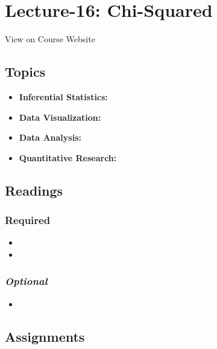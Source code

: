 \documentclass[]{book}
\providecommand{\tightlist}{%
  \setlength{\itemsep}{0pt}\setlength{\parskip}{0pt}}
\theoremstyle{definition}
\theoremstyle{definition}
\theoremstyle{definition}
\theoremstyle{remark}
\begin{document}
\section{Lecture-16: Chi-Squared}\label{lecture-16-chi-squared}

View on Course Website

\subsection*{Topics}\label{topics-16}

\begin{itemize}
\tightlist
\item
  \textbf{Inferential Statistics:}
\item
  \textbf{Data Visualization:}
\item
  \textbf{Data Analysis:}
\item
  \textbf{Quantitative Research:}
\end{itemize}

\subsection*{Readings}\label{readings-17}

\subsubsection*{Required}\label{required-16}

\begin{itemize}
\item
\item
\end{itemize}

\subsubsection*{\texorpdfstring{\emph{Optional}}{Optional}}\label{optional-16}

\begin{itemize}
\item
\end{itemize}

\subsection*{Assignments}\label{assignments-17}
\end{document}
